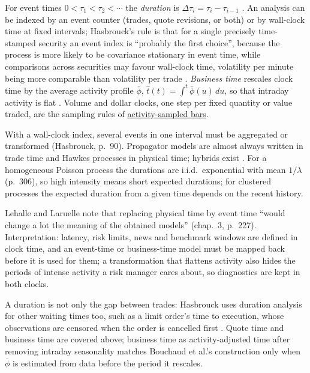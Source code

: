 \begin{qfdefinition}\label{def:market-clocks-durations}
 For event times $0<\tau_1<\tau_2<\cdots$ the \emph{duration} is $\Delta\tau_i=\tau_i-\tau_{i-1}$ \citep[app.~A, sec.~A.12.1, Definition~5, p.~306]{alpha-laruelle}. An analysis can be indexed by an event counter (trades, quote revisions, or both) or by wall-clock time at fixed intervals; Hasbrouck's rule is that for a single precisely time-stamped security an event index is ``probably the first choice'', because the process is more likely to be covariance stationary in event time, while comparisons across securities may favour wall-clock time, volatility per minute being more comparable than volatility per trade \citep[sec.~9.7.3, p.~90]{s6-hasbrouck}. \emph{Business time} rescales clock time by the average activity profile $\bar\phi$, $\hat t(t)=\int^t\bar\phi(u)\,du$, so that intraday activity is flat \citep[chap.~9, sec.~9.3.1, p.~173]{catalogue-0528}. Volume and dollar clocks, one step per fixed quantity or value traded, are the sampling rules of \hyperref[meth:activity-sampled-bars]{activity-sampled bars}.

 With a wall-clock index, several events in one interval must be aggregated or transformed (Hasbrouck, p.~90). Propagator models are almost always written in trade time and Hawkes processes in physical time; hybrids exist \citep[app.~A, sec.~A.12.3, p.~311]{alpha-laruelle}. For a homogeneous Poisson process the durations are i.i.d.\ exponential with mean $1/\lambda$ (p.~306), so high intensity means short expected durations; for clustered processes the expected duration from a given time depends on the recent history.

 Lehalle and Laruelle note that replacing physical time by event time ``would change a lot the meaning of the obtained models'' (chap.~3, p.~227). Interpretation: latency, risk limits, news and benchmark windows are defined in clock time, and an event-time or business-time model must be mapped back before it is used for them; a transformation that flattens activity also hides the periods of intense activity a risk manager cares about, so diagnostics are kept in both clocks.

 A duration is not only the gap between trades: Hasbrouck uses duration analysis for other waiting times too, such as a limit order's time to execution, whose observations are censored when the order is cancelled first \citep[sec.~15.2.3, pp.~163--164]{s6-hasbrouck}. Quote time and business time are covered above; business time as activity-adjusted time after removing intraday seasonality matches Bouchaud et al.'s construction only when $\bar\phi$ is estimated from data before the period it rescales.


\end{qfdefinition}

